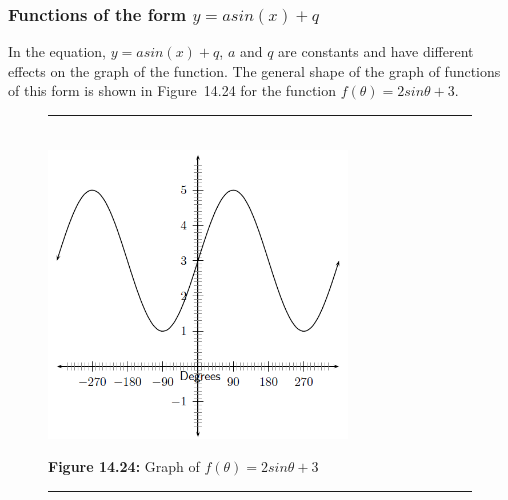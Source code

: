             \subsubsection{ Functions of the form $y=asin\left(x\right)+q$}
            \nopagebreak
        \label{m39414*id84527}In the equation, $y=asin\left(x\right)+q$, $a$ and $q$ are constants and have different effects on the graph of the function. The general shape of the graph of functions of this form is shown in Figure~14.24 for the function $f\left(\theta \right)=2sin\theta +3$.\par 
    \setcounter{subfigure}{0}
	\begin{figure}[H] %
    \begin{center}
    \rule[.1in]{\figurerulewidth}{.005in} \\
        \label{m39414*uid33!!!underscore!!!media}\label{m39414*uid33!!!underscore!!!printimage}\includegraphics[width=300px]{col11306.imgs/m39414_trigrep.png} %
      \vspace{2pt}
    \vspace{\rubberspace}\par \begin{cnxcaption}
	  \small \textbf{Figure 14.24: }Graph of $f\left(\theta \right)=2sin\theta +3$
	\end{cnxcaption}
    \vspace{.1in}
    \rule[.1in]{\figurerulewidth}{.005in} \\
    \end{center}
 \end{figure}       
\label{m39414*secfhsst!!!underscore!!!id2083}
